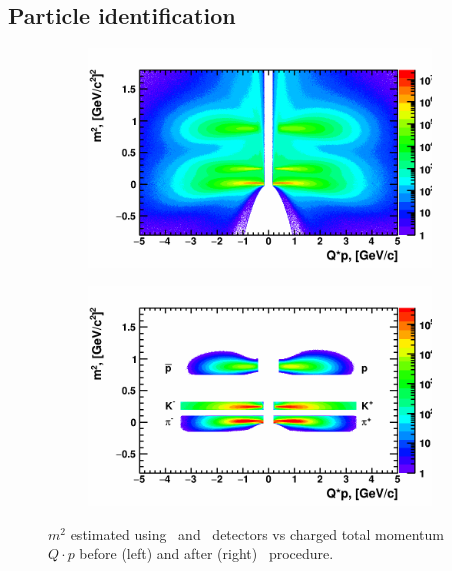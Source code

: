 \FloatBarrier
\subsection {Particle identification}

\begin{figure}[ht]
    \begin{subfigure}{.49\textwidth}
        \centering
        \includegraphics[width=1.\linewidth]{Figures/M2Qp_before_PID.png}
    \end{subfigure}
    \begin{subfigure}{.49\textwidth}
        \centering
        \includegraphics[width=1.\linewidth]{Figures/M2Qp_after_PID.png}
    \end{subfigure}
    \label{fig:M2vsQp}
    \caption{$m^2$ estimated using \TPC\ and \TOF\ detectors vs charged total momentum $Q\cdot p$ before (left) and after (right) \PID\ procedure.}
\end{figure}